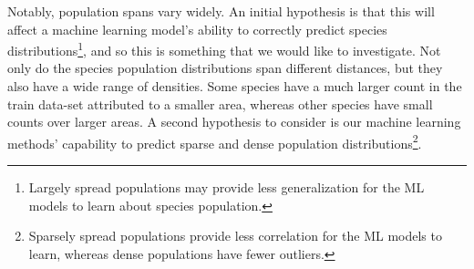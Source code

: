 Notably, population spans vary widely. An initial hypothesis is that this will affect a machine learning model's ability to correctly predict species distributions\footnote{Largely spread populations may provide less generalization for the ML models to learn about species population.}, and so this is something that we would like to investigate. 
Not only do the species population distributions span different distances, but they also have a wide range of densities. Some species have a much larger count in the train data-set attributed to a smaller area, whereas other species have small counts over larger areas.
A second hypothesis to consider is our machine learning methods' capability to predict sparse and dense population distributions\footnote{Sparsely spread populations provide less correlation for the ML models to learn, whereas dense populations have fewer outliers.}.




